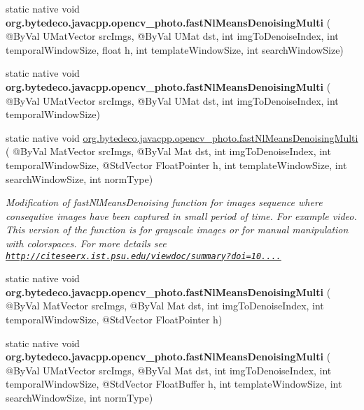 \begin{DoxyCompactItemize}
\item 
\mbox{\label{group__photo__denoise_ga5725faedd7c4e333a07db461b7d2645e}} 
static native void {\bfseries org.\+bytedeco.\+javacpp.\+opencv\+\_\+photo.\+fast\+Nl\+Means\+Denoising\+Multi} ( @By\+Val U\+Mat\+Vector src\+Imgs, @By\+Val U\+Mat dst, int img\+To\+Denoise\+Index, int temporal\+Window\+Size, float h, int template\+Window\+Size, int search\+Window\+Size)
\item 
\mbox{\label{group__photo__denoise_ga9e54ba693763e9e123c818b5e3af49d9}} 
static native void {\bfseries org.\+bytedeco.\+javacpp.\+opencv\+\_\+photo.\+fast\+Nl\+Means\+Denoising\+Multi} ( @By\+Val U\+Mat\+Vector src\+Imgs, @By\+Val U\+Mat dst, int img\+To\+Denoise\+Index, int temporal\+Window\+Size)
\item 
static native void \hyperlink{group__photo__denoise_ga754f5006e8d8b4b484b29d01a8a993da}{org.\+bytedeco.\+javacpp.\+opencv\+\_\+photo.\+fast\+Nl\+Means\+Denoising\+Multi} ( @By\+Val Mat\+Vector src\+Imgs, @By\+Val Mat dst, int img\+To\+Denoise\+Index, int temporal\+Window\+Size, @Std\+Vector Float\+Pointer h, int template\+Window\+Size, int search\+Window\+Size, int norm\+Type)
\begin{DoxyCompactList}\small\item\em Modification of fast\+Nl\+Means\+Denoising function for images sequence where consequtive images have been captured in small period of time. For example video. This version of the function is for grayscale images or for manual manipulation with colorspaces. For more details see \href{http://citeseerx.ist.psu.edu/viewdoc/summary?doi=10.1.1.131.6394}{\tt http\+://citeseerx.\+ist.\+psu.\+edu/viewdoc/summary?doi=10....} \end{DoxyCompactList}\item 
\mbox{\label{group__photo__denoise_ga78f71a09ac4eae305bab2fd569d68eb7}} 
static native void {\bfseries org.\+bytedeco.\+javacpp.\+opencv\+\_\+photo.\+fast\+Nl\+Means\+Denoising\+Multi} ( @By\+Val Mat\+Vector src\+Imgs, @By\+Val Mat dst, int img\+To\+Denoise\+Index, int temporal\+Window\+Size, @Std\+Vector Float\+Pointer h)
\item 
\mbox{\label{group__photo__denoise_ga81923f13becc49d6108357949295e5d0}} 
static native void {\bfseries org.\+bytedeco.\+javacpp.\+opencv\+\_\+photo.\+fast\+Nl\+Means\+Denoising\+Multi} ( @By\+Val U\+Mat\+Vector src\+Imgs, @By\+Val Mat dst, int img\+To\+Denoise\+Index, int temporal\+Window\+Size, @Std\+Vector Float\+Buffer h, int template\+Window\+Size, int search\+Window\+Size, int norm\+Type)

\end{DoxyCompactItemize}
